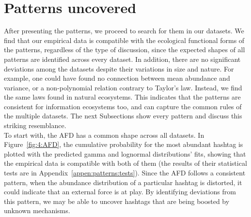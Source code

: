 \section{Patterns uncovered}

After presenting the patterns, we proceed to search for them in our datasets. We find that our empirical data is compatible with the ecological functional forms of the patterns, regardless of the type of discussion, since the expected shapes of all patterns are identified across every dataset. In addition, there are no significant deviations among the datasets despite their variations in size and nature. For example, one could have found no connection between mean abundance and variance, or a non-polynomial relation contrary to Taylor's law. Instead, we find the same laws found in natural ecosystems. This indicates that the patterns are consistent for information ecosystems too, and can capture the common rules of the multiple datasets. The next Subsections show every pattern and discuss this striking resemblance.\\

To start with, the AFD has a common shape across all datasets. In Figure~\ref{fig:4:AFD}, the cumulative probability for the most abundant hashtag is plotted with the predicted gamma and lognormal distributions' fits, showing that the empirical data is compatible with both of them (the results of their statistical tests are in Appendix~\ref{appen:patterns:tests}).  Since the AFD follows a consistent pattern, when the abundance distribution of a particular hashtag is distorted, it could indicate that an external force is at play. By identifying deviations from this pattern, we may be able to uncover hashtags that are being boosted by unknown mechanisms.\\

